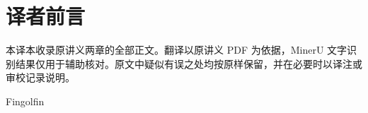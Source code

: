 \documentclass[BookTitleCN={代数与 Galois 理论},OriginalAuthor={Jean-François Dat},OriginalYear={2015-2016},Translator={Fingolfin},TranslationDate={2026年10月24日},ModelUsed={Codex},BibStyle=numeric]{mathtranslation}
\begin{document}
\hypersetup{pageanchor=false}
\makecover
\cleardoublepage
\hypersetup{pageanchor=true}
\frontmatter
\chapter*{译者前言}
本译本收录原讲义两章的全部正文。翻译以原讲义 PDF 为依据，MinerU 文字识别结果仅用于辅助核对。原文中疑似有误之处均按原样保留，并在必要时以译注或审校记录说明。
\par\medskip\hfill Fingolfin
\makecontents
\mainmatter



















\backmatter
\printterminology
\end{document}
